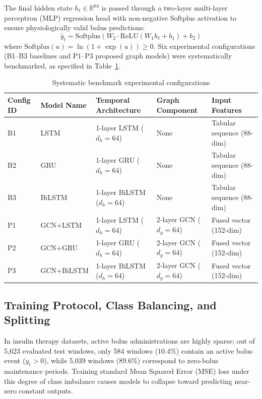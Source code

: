 \documentclass[10pt,a4paper]{article}
\begin{document}
The final hidden state $h_t \in \mathbb{R}^{64}$ is passed through a two-layer multi-layer perceptron (MLP) regression head with non-negative Softplus activation to ensure physiologically valid bolus predictions:
\begin{equation}
\hat{y}_t = \mathrm{Softplus}\left(W_2 \cdot \mathrm{ReLU}(W_1 h_t + b_1) + b_2\right)
\end{equation}
where $\mathrm{Softplus}(u) = \ln(1 + \exp(u)) \ge 0$. Six experimental configurations (B1--B3 baselines and P1--P3 proposed graph models) were systematically benchmarked, as specified in Table~\ref{tab:config}.

\begin{table}[htbp]
\caption{Systematic benchmark experimental configurations}\label{tab:config}
\small
\begin{tabular*}{\textwidth}{@{\extracolsep{\fill}}lllll@{}}
\toprule
Config ID & Model Name & Temporal Architecture & Graph Component & Input Features \\
\midrule
B1 & LSTM & 1-layer LSTM ($d_h=64$) & None & Tabular sequence (88-dim) \\
B2 & GRU & 1-layer GRU ($d_h=64$) & None & Tabular sequence (88-dim) \\
B3 & BiLSTM & 1-layer BiLSTM ($d_h=64$) & None & Tabular sequence (88-dim) \\
P1 & GCN+LSTM & 1-layer LSTM ($d_h=64$) & 2-layer GCN ($d_g=64$) & Fused vector (152-dim) \\
P2 & GCN+GRU & 1-layer GRU ($d_h=64$) & 2-layer GCN ($d_g=64$) & Fused vector (152-dim) \\
P3 & GCN+BiLSTM & 1-layer BiLSTM ($d_h=64$) & 2-layer GCN ($d_g=64$) & Fused vector (152-dim) \\
\bottomrule
\end{tabular*}
\end{table}

\subsection{Training Protocol, Class Balancing, and Splitting}
In insulin therapy datasets, active bolus administrations are highly sparse: out of 5,623 evaluated test windows, only 584 windows (10.4\%) contain an active bolus event ($y_t > 0$), while 5,039 windows (89.6\%) correspond to zero-bolus maintenance periods. Training standard Mean Squared Error (MSE) loss under this degree of class imbalance causes models to collapse toward predicting near-zero constant outputs.
\end{document}
